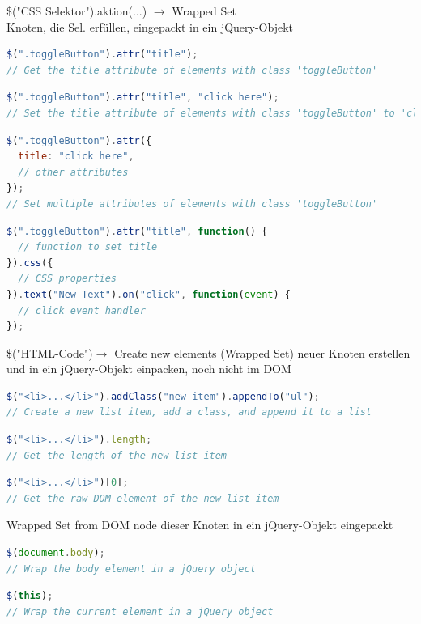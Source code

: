 \begin{definition}{\$("CSS Selektor").aktion(...)} $\rightarrow$ Wrapped Set\\
  Knoten, die Sel. erfüllen, eingepackt in ein jQuery-Objekt
\begin{lstlisting}[language=JavaScript, style=basesmol]
$(".toggleButton").attr("title");
// Get the title attribute of elements with class 'toggleButton'
\end{lstlisting}
\begin{lstlisting}[language=JavaScript, style=basesmol]
$(".toggleButton").attr("title", "click here");
// Set the title attribute of elements with class 'toggleButton' to 'click here'
\end{lstlisting}
\begin{lstlisting}[language=JavaScript, style=basesmol]
$(".toggleButton").attr({
  title: "click here",
  // other attributes
});
// Set multiple attributes of elements with class 'toggleButton'
\end{lstlisting}
\begin{lstlisting}[language=JavaScript, style=basesmol]
$(".toggleButton").attr("title", function() {
  // function to set title
}).css({
  // CSS properties
}).text("New Text").on("click", function(event) {
  // click event handler
});
\end{lstlisting}
\end{definition}

\begin{definition}{\$("HTML-Code")}$\rightarrow$ Create new elements (Wrapped Set)
  neuer Knoten erstellen und in ein jQuery-Objekt einpacken, noch nicht im DOM
\begin{lstlisting}[language=JavaScript, style=basesmol]
$("<li>...</li>").addClass("new-item").appendTo("ul");
// Create a new list item, add a class, and append it to a list
\end{lstlisting}
\begin{lstlisting}[language=JavaScript, style=basesmol]
$("<li>...</li>").length;
// Get the length of the new list item
\end{lstlisting}
\begin{lstlisting}[language=JavaScript, style=basesmol]
$("<li>...</li>")[0];
// Get the raw DOM element of the new list item
\end{lstlisting}
\end{definition}

\begin{definition}{Wrapped Set from DOM node}
  dieser Knoten in ein jQuery-Objekt eingepackt
\begin{lstlisting}[language=JavaScript, style=basesmol]
$(document.body);
// Wrap the body element in a jQuery object
\end{lstlisting}
\begin{lstlisting}[language=JavaScript, style=basesmol]
$(this);
// Wrap the current element in a jQuery object
\end{lstlisting}
\end{definition}

